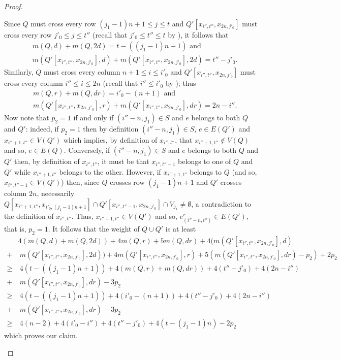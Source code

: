 \begin{proof}
\begin{claimproof}
Since $Q$ must cross every row $(j_1-1)n+1 \leq j \leq t$ and $Q'[x_{i'',t''},x_{2n,j'_0}]$ must cross every row $j'_0 \leq j \leq t''$ (recall that $j'_0 \leq t'' \leq t$ by ), it follows that
\begin{equation*}
\begin{split}
& m(Q,d) + m(Q,2d) = t-((j_1-1)n+1) \text{ and}\\
& m(Q'[x_{i'',t''},x_{2n,j'_0}],d) + m(Q'[x_{i'',t''},x_{2n,j'_0}],2d) = t'' - j'_0.
\end{split}
\end{equation*} 
Similarly, $Q$ must cross every column $n+1 \leq i \leq i'_0$ and $Q'[x_{i'',t''},x_{2n,j'_0}]$ must cross every column $i'' \leq i \leq 2n$ (recall that $i'' \leq i'_0$ by ); thus
\begin{equation*}
\begin{split}
& m(Q,r) + m(Q,dr) = i'_0 - (n+1) \text{ and}\\
& m(Q'[x_{i'',t''},x_{2n,j'_0}],r) + m(Q'[x_{i'',t''},x_{2n,j'_0}],dr) = 2n-i''.
\end{split}
\end{equation*}
Now note that $p_2 =1$ if and only if $(i''-n,j_1) \in S$ and $e$ belongs to both $Q$ and $Q'$: indeed, if $p_2=1$ then by definition $(i''-n,j_1) \in S$, $e \in E(Q')$ and $x_{i''+1,t''} \in V(Q')$ which implies, by definition of $x_{i'',t''}$, that $x_{i''+1,t''} \notin V(Q)$ and so, $e \in E(Q)$. Conversely, if $(i''-n,j_1) \in S$ and $e$ belongs to both $Q$ and $Q'$ then, by definition of $x_{i'',t''}$, it must be that $x_{i'',t''-1}$ belongs to one of $Q$ and $Q'$ while $x_{i''+1,t''}$ belongs to the other. However, if $x_{i''+1,t''}$ belongs to $Q$ (and so, $x_{i'',t''-1} \in V(Q')$) then, since $Q$ crosses row $(j_1-1)n+1$ and $Q'$ crosses column $2n$, necessarily $Q[x_{i''+1,t''},x_{i'_0,(j_1-1)n+1}] \cap Q'[x_{i'',t''-1},x_{2n,j'_0}] \cap V_{j_1} \neq \emptyset$, a contradiction to the definition of $x_{i'',t''}$. Thus, $x_{i''+1,t''} \in V(Q')$ and so, $e^r_{(i''-n,t'')} \in E(Q')$, that is, $p_2=1$. It follows that the weight of $Q \cup Q'$ is at least
\begin{equation*}
\begin{split}
&  4(m(Q,d) + m(Q,2d)) + 4m(Q,r) + 5m(Q,dr) + 4(m(Q'[x_{i'',t''},x_{2n,j'_0}],d) \\ 
+&~m(Q'[x_{i'',t''},x_{2n,j'_0}],2d))+4m(Q'[x_{i'',t''},x_{2n,j'_0}],r) + 5(m(Q'[x_{i'',t''},x_{2n,j'_0}],dr) - p_2) + 2p_2\\
\geq &~4(t-((j_1-1)n+1)) + 4(m(Q,r) + m(Q,dr)) + 4(t''-j'_0) + 4(2n-i'')\\ 
+&~ m(Q'[x_{i'',t''},x_{2n,j'_0}],dr) - 3p_2\\
\geq &~4(t-((j_1-1)n+1)) + 4(i'_0-(n+1)) + 4(t'' - j'_0) + 4(2n - i'')\\
+&~m(Q'[x_{i'',t''},x_{2n,j'_0}],dr) - 3p_2\\
\geq & ~4(n-2) + 4(i'_0-i'') + 4(t''-j'_0) + 4(t-(j_1-1)n) - 2p_2
\end{split}
\end{equation*}
which proves our claim.
\end{claimproof}


\end{proof}
